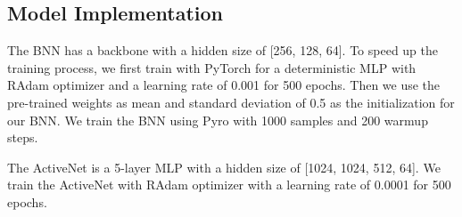 \subsection{Model Implementation}
The BNN has a backbone with a hidden size of [256, 128, 64]. To speed up the training process, we first train with PyTorch for a deterministic MLP with RAdam \cite{liu2019radam} optimizer and a learning rate of 0.001 for 500 epochs. Then we use the pre-trained weights as mean and standard deviation of 0.5 as the initialization for our BNN. We train the BNN using Pyro with 1000 samples and 200 warmup steps. 

The ActiveNet is a 5-layer MLP with a hidden size of [1024, 1024, 512, 64]. We train the ActiveNet with RAdam optimizer with a learning rate of 0.0001 for 500 epochs.